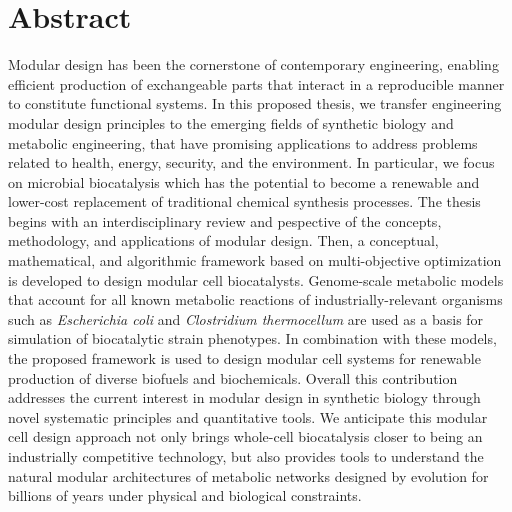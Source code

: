 \chapter*{Abstract}\label{ch:abstract}
Modular design has been the cornerstone of contemporary engineering, enabling efficient production of exchangeable parts that interact in a reproducible manner to constitute functional systems.
    In this proposed thesis, we transfer engineering modular design principles to the emerging fields of synthetic biology and metabolic engineering, that have promising applications to address problems related to health, energy, security, and the environment. In particular, we focus on microbial biocatalysis which has the potential to become a renewable and lower-cost replacement of traditional chemical synthesis processes.
    The thesis begins with an interdisciplinary review and pespective of the concepts, methodology, and applications of modular design.
    Then, a conceptual, mathematical, and algorithmic framework based on multi-objective optimization is developed to design modular cell biocatalysts.
    Genome-scale metabolic models that account for all known metabolic reactions of industrially-relevant organisms such as \textit{Escherichia coli} and \textit{Clostridium thermocellum} are used as a basis for simulation of biocatalytic strain phenotypes.
    In combination with these models, the proposed framework is used to design modular cell systems for renewable production of diverse biofuels and biochemicals.%
    Overall this contribution addresses the current interest in modular design in synthetic biology through novel systematic principles and quantitative tools.
    We anticipate this modular cell design approach not only brings whole-cell biocatalysis closer to being an industrially competitive technology, but also provides tools to understand the natural modular architectures of metabolic networks designed by evolution for billions of years under physical and biological constraints.
